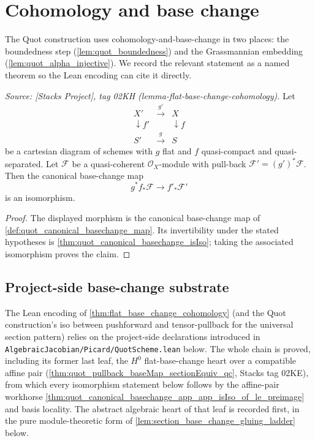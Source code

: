 \section{Cohomology and base change}
\label{sec:cohomology_base_change}

The Quot construction uses cohomology-and-base-change in two places: the
boundedness step (\cref{lem:quot_boundedness}) and the Grassmannian
embedding (\cref{lem:quot_alpha_injective}). We record the relevant
statement as a named theorem so the Lean encoding can cite it directly.

\begin{theorem}\leanok
  \label{thm:flat_base_change_cohomology}
  \textit{Source: [Stacks Project], tag 02KH (lemma-flat-base-change-cohomology).}
  Let
  \[
    \begin{array}{ccc}
      X' & \xrightarrow{g'} & X \\
      \downarrow f' &  & \downarrow f \\
      S' & \xrightarrow{g} & S
    \end{array}
  \]
  be a cartesian diagram of schemes with \(g\) flat and \(f\) quasi-compact and
  quasi-separated. Let \(\mathcal{F}\) be a quasi-coherent
  \(\mathcal{O}_X\)-module with pull-back
  \(\mathcal{F}' = (g')^* \mathcal{F}\). Then the canonical base-change map
  \[
    g^* f_* \mathcal{F} \longrightarrow f'_* \mathcal{F}'
  \]
  is an isomorphism.
\end{theorem}
\begin{proof}\leanok
  The displayed morphism is the canonical base-change map of
  \cref{def:quot_canonical_basechange_map}. Its invertibility under the stated
  hypotheses is \cref{thm:quot_canonical_basechange_isIso}; taking the associated
  isomorphism proves the claim.
\end{proof}

\subsection{Project-side base-change substrate}
\label{subsec:quot_project_basechange}

The Lean encoding of \cref{thm:flat_base_change_cohomology} (and the
Quot construction's iso between pushforward and tensor-pullback for the
universal section pattern) relies on the project-side declarations
introduced in \texttt{AlgebraicJacobian/Picard/QuotScheme.lean} below.
The whole chain is proved, including its former last leaf, the \(H^0\)
flat-base-change heart over a compatible affine pair
(\cref{thm:quot_pullback_baseMap_sectionEquiv_qc}, Stacks tag 02KE), from
which every isomorphism statement below follows by the affine-pair
workhorse \cref{thm:quot_canonical_basechange_app_app_isIso_of_le_preimage}
and basis locality. The abstract algebraic heart of that leaf is recorded
first, in the pure module-theoretic form of
\cref{lem:section_base_change_gluing_ladder} below.


